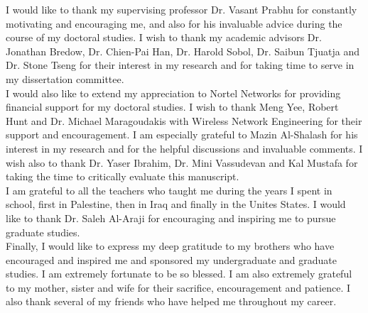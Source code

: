 I would like to thank my supervising professor Dr. Vasant Prabhu for constantly motivating
and encouraging me, and also for his invaluable advice during the course of my doctoral studies.
I wish to thank my academic advisors Dr. Jonathan Bredow, Dr. Chien-Pai Han, Dr. Harold Sobol,
Dr. Saibun Tjuatja and Dr. Stone Tseng for their interest in my research and for taking time to
serve in my dissertation committee.\\

I would also like to extend my appreciation to Nortel Networks for providing
financial support for my doctoral studies. I wish to thank Meng Yee, Robert Hunt and
Dr. Michael Maragoudakis with Wireless Network Engineering for their support and encouragement.
I am especially grateful to Mazin Al-Shalash for  his interest in my research and for the helpful
discussions and invaluable comments. I wish also to thank Dr. Yaser Ibrahim, Dr. Mini Vassudevan and
Kal Mustafa for taking the time to critically evaluate this manuscript.\\

I am grateful to all the teachers who taught me during the years I spent in school, first
in Palestine, then in Iraq and finally in the Unites States. I would like to thank Dr. Saleh Al-Araji
for encouraging and inspiring me to pursue graduate studies.\\


Finally, I would like to express my deep gratitude to my brothers
who have encouraged and inspired me and sponsored my undergraduate
and graduate studies. I am extremely fortunate to be so blessed. I
am also extremely grateful to my mother, sister and wife for their
sacrifice, encouragement and patience. I also thank several of my
friends who have helped me throughout my career.
